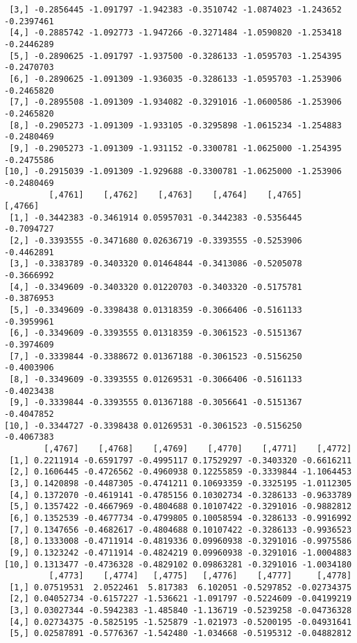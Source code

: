 \documentclass[
  letterpaper,
  DIV=11,
  numbers=noendperiod]{scrreprt}
\begin{document}
\begin{verbatim}
 [3,] -0.2856445 -1.091797 -1.942383 -0.3510742 -1.0874023 -1.243652 -0.2397461
 [4,] -0.2885742 -1.092773 -1.947266 -0.3271484 -1.0590820 -1.253418 -0.2446289
 [5,] -0.2890625 -1.091797 -1.937500 -0.3286133 -1.0595703 -1.254395 -0.2470703
 [6,] -0.2890625 -1.091309 -1.936035 -0.3286133 -1.0595703 -1.253906 -0.2465820
 [7,] -0.2895508 -1.091309 -1.934082 -0.3291016 -1.0600586 -1.253906 -0.2465820
 [8,] -0.2905273 -1.091309 -1.933105 -0.3295898 -1.0615234 -1.254883 -0.2480469
 [9,] -0.2905273 -1.091309 -1.931152 -0.3300781 -1.0625000 -1.254395 -0.2475586
[10,] -0.2915039 -1.091309 -1.929688 -0.3300781 -1.0625000 -1.253906 -0.2480469
         [,4761]    [,4762]    [,4763]    [,4764]    [,4765]    [,4766]
 [1,] -0.3442383 -0.3461914 0.05957031 -0.3442383 -0.5356445 -0.7094727
 [2,] -0.3393555 -0.3471680 0.02636719 -0.3393555 -0.5253906 -0.4462891
 [3,] -0.3383789 -0.3403320 0.01464844 -0.3413086 -0.5205078 -0.3666992
 [4,] -0.3349609 -0.3403320 0.01220703 -0.3403320 -0.5175781 -0.3876953
 [5,] -0.3349609 -0.3398438 0.01318359 -0.3066406 -0.5161133 -0.3959961
 [6,] -0.3349609 -0.3393555 0.01318359 -0.3061523 -0.5151367 -0.3974609
 [7,] -0.3339844 -0.3388672 0.01367188 -0.3061523 -0.5156250 -0.4003906
 [8,] -0.3349609 -0.3393555 0.01269531 -0.3066406 -0.5161133 -0.4023438
 [9,] -0.3339844 -0.3393555 0.01367188 -0.3056641 -0.5151367 -0.4047852
[10,] -0.3344727 -0.3398438 0.01269531 -0.3061523 -0.5156250 -0.4067383
        [,4767]    [,4768]    [,4769]    [,4770]    [,4771]    [,4772]
 [1,] 0.2211914 -0.6591797 -0.4995117 0.17529297 -0.3403320 -0.6616211
 [2,] 0.1606445 -0.4726562 -0.4960938 0.12255859 -0.3339844 -1.1064453
 [3,] 0.1420898 -0.4487305 -0.4741211 0.10693359 -0.3325195 -1.0112305
 [4,] 0.1372070 -0.4619141 -0.4785156 0.10302734 -0.3286133 -0.9633789
 [5,] 0.1357422 -0.4667969 -0.4804688 0.10107422 -0.3291016 -0.9882812
 [6,] 0.1352539 -0.4677734 -0.4799805 0.10058594 -0.3286133 -0.9916992
 [7,] 0.1347656 -0.4682617 -0.4804688 0.10107422 -0.3286133 -0.9936523
 [8,] 0.1333008 -0.4711914 -0.4819336 0.09960938 -0.3291016 -0.9975586
 [9,] 0.1323242 -0.4711914 -0.4824219 0.09960938 -0.3291016 -1.0004883
[10,] 0.1313477 -0.4736328 -0.4829102 0.09863281 -0.3291016 -1.0034180
         [,4773]    [,4774]   [,4775]   [,4776]    [,4777]     [,4778]
 [1,] 0.07519531  2.0522461  5.817383  6.102051 -0.5297852 -0.02734375
 [2,] 0.04052734 -0.6157227 -1.536621 -1.091797 -0.5224609 -0.04199219
 [3,] 0.03027344 -0.5942383 -1.485840 -1.136719 -0.5239258 -0.04736328
 [4,] 0.02734375 -0.5825195 -1.525879 -1.021973 -0.5200195 -0.04931641
 [5,] 0.02587891 -0.5776367 -1.542480 -1.034668 -0.5195312 -0.04882812

\end{verbatim}
\end{document}
